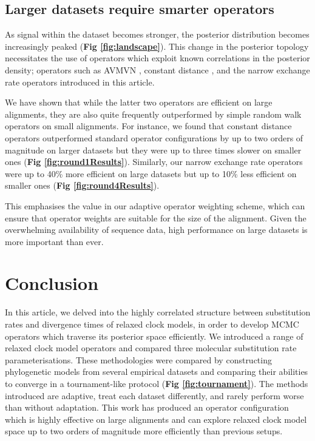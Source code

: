 \documentclass[10pt,letterpaper]{article}
\begin{document}
	
	
\subsection*{Larger datasets require smarter operators}

As signal within the dataset becomes stronger, the posterior distribution becomes increasingly peaked (\textbf{Fig \ref{fig:landscape}}).
This change in the posterior topology necessitates the use of operators which exploit known correlations in the posterior density; operators such as AVMVN \cite{baele2017adaptive}, constant distance \cite{zhang2020improving}, and the narrow exchange rate operators introduced in this article.

We have shown that while the latter two operators are efficient on large alignments, they are also quite frequently outperformed by simple random walk operators on small alignments.
For instance, we found that constant distance operators outperformed standard operator configurations by up to two orders of magnitude on larger datasets but they were up to three times slower on smaller ones (\textbf{Fig \ref{fig:round1Results}}). 
Similarly, our narrow exchange rate operators were up to 40\% more efficient on large datasets but up to 10\% less efficient on smaller ones (\textbf{Fig \ref{fig:round4Results}}).

This emphasises the value in our adaptive operator weighting scheme, which can ensure that operator weights are suitable for the size of the alignment.
Given the overwhelming availability of sequence data, high performance on large datasets is more important than ever.



\section*{Conclusion}

In this article, we delved into the highly correlated structure between substitution rates and divergence times of relaxed clock models, in order to develop MCMC operators which traverse its posterior space efficiently.
We introduced a range of relaxed clock model operators and compared three molecular substitution rate parameterisations.
These methodologies were compared by constructing phylogenetic models from several empirical datasets and comparing their abilities to converge in a tournament-like protocol (\textbf{Fig \ref{fig:tournament}}).
The methods introduced are adaptive, treat each dataset differently, and rarely perform worse than without adaptation. 
This work has produced an operator configuration which is highly effective  on large alignments and can explore relaxed clock model space up to two orders of magnitude more efficiently than previous setups.
\end{document}
